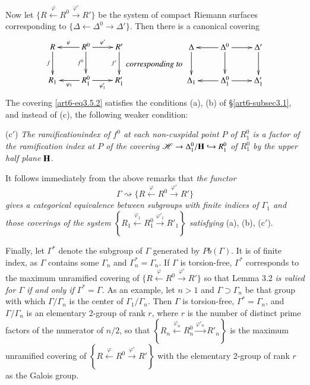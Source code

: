 Now let $\{R \xleftarrow{\varphi} R^0 \xrightarrow{\varphi'} R'\}$ be the system of compact Riemann surfaces corresponding to $\{\Delta \leftarrow \Delta^0 \rightarrow \Delta'\}$. Then there is a canonical covering 
\setcounter{equation}{1}
\begin{equation}
\vcenter{
\xymatrix{
R \ar[d]_-f & R^0\ar[r]^-{\varphi'}\ar[d]_-{f^0}\ar[l]_-{\varphi} & R' \ar[d]_-{f'}\\
R_1 & R^0_1 \ar[r]_-{\varphi'_1} \ar[l]^-{\varphi_1} & R'_1
}}
\textit{corresponding to }
\vcenter{
\xymatrix{
\Delta \ar[d] & \Delta^0\ar[r] \ar[d] \ar[l]& \Delta' \ar[d]\\
\Delta_1 & \Delta^0_1 \ar[r] \ar[l]& \Delta'_1
}}\label{art6-eq3.5.2}
\end{equation}
The covering \eqref{art6-eq3.5.2} satisfies the conditions (a), (b) of \S \ref{art6-subsec3.1}, and instead of (c), the following weaker condition:

(c$'$) \textit{The ramification\pageoriginale index of $f^0$ at each non-cuspidal point $P$ of $R^0_1$ is a factor of the ramification index at $P$ of the covering $\mathscr{H} \to \Delta^0_1 / \mathbf{H} \hookrightarrow R^0_1$ of $R^0_1$ by the upper half plane $\mathbf{H}$}.

It follows immediately from the above remarks that \textit{the functor}
\begin{equation}
\Gamma \rightsquigarrow \{R \xleftarrow{\varphi} R^0 \xrightarrow{\varphi'} R'\} \label{art6-eq3.5.3}
\end{equation}
\textit{gives a categorical equivalence between subgroups with finite indices of $\Gamma_1$ and those coverings of the system $\left\{R_1 \xleftarrow{\varphi_1} R^0_1  \xrightarrow{\varphi'_1} R'_1\right\}$ satisfying} (a), (b), (c$'$).

Finally, let $\Gamma^\ast$ denote the subgroup of $\Gamma$ generated by $Pb(\Gamma)$. It is of finite index, as $\Gamma$ contains some $\Gamma_n$ and $\Gamma^\ast_n = \Gamma_n$. If $\Gamma$ is torsion-free, $\Gamma^\ast$ corresponds to the maximum unramified covering of $\{R \xleftarrow{\varphi} R^0 \xrightarrow{\varphi'} R'\}$ so that Lemma 3.2 \textit{is valied for $\Gamma$ if and only if $\Gamma^\ast = \Gamma$.} As an example, let $n >1$  and $\Gamma \supset \Gamma_n$ be that group with which $\Gamma / \Gamma_n$ is the center of $\Gamma_1 / \Gamma_n$. Then $\Gamma$ is torsion-free, $\Gamma^\ast = \Gamma_n$, and $\Gamma / \Gamma_n$ is an elementary 2-group of rank $r$, where $r$ is the number of distinct prime factors of the numerator of $n/2$, so that $\left\{R_n \xleftarrow{\varphi_n} R^0_n \xrightarrow{\varphi'_n} R'_n\right\}$ is the maximum unramified covering of $\left\{R \xleftarrow{\varphi} R^0 \xrightarrow{\varphi'} R' \right\}$ with the elementary 2-group of rank $r$ as the Galois group.

